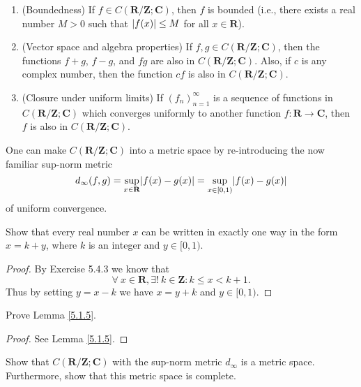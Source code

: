 \begin{lemma}\label{5.1.5}
    \quad
    \begin{enumerate}
        \item (Boundedness)
              If \(f \in C(\mathbf{R} / \mathbf{Z} ; \mathbf{C})\), then \(f\) is bounded
              (i.e., there
              exists a real number \(M > 0\) such that \(\abs*{f(x)} \leq M\) for all \(x \in \mathbf{R}\)).
        \item (Vector space and algebra properties)
              If \(f, g \in C(\mathbf{R} / \mathbf{Z} ; \mathbf{C})\), then the functions \(f + g\), \(f - g\), and \(f g\) are also in \(C(\mathbf{R} / \mathbf{Z} ; \mathbf{C})\).
              Also, if \(c\) is any complex number, then the function \(cf\) is also in \(C(\mathbf{R} / \mathbf{Z} ; \mathbf{C})\).
        \item (Closure under uniform limits)
              If \((f_n)_{n = 1}^\infty\) is a sequence of functions in \(C(\mathbf{R} / \mathbf{Z} ; \mathbf{C})\) which converges uniformly to another function \(f : \mathbf{R} \to \mathbf{C}\), then \(f\) is also in \(C(\mathbf{R} / \mathbf{Z} ; \mathbf{C})\).
    \end{enumerate}
\end{lemma}

\begin{note}
    One can make \(C(\mathbf{R} / \mathbf{Z} ; \mathbf{C})\) into a metric space by re-introducing the now familiar sup-norm metric
    \[
        d_\infty(f, g) = \sup_{x \in \mathbf{R}} \abs*{f(x) - g(x)} = \sup_{x \in [0, 1)} \abs*{f(x) - g(x)}
    \]
    of uniform convergence.
\end{note}

\exercisesection

\begin{exercise}\label{ex 5.1.1}
    Show that every real number \(x\) can be written in exactly one way in the form \(x = k + y\), where \(k\) is an integer and \(y \in [0, 1)\).
\end{exercise}

\begin{proof}
    By Exercise 5.4.3 we know that
    \[
        \forall\ x \in \mathbf{R}, \exists!\ k \in \mathbf{Z} : k \leq x < k + 1.
    \]
    Thus by setting \(y = x - k\) we have \(x = y + k\) and \(y \in [0, 1)\).
\end{proof}

\begin{exercise}\label{ex 5.1.2}
    Prove Lemma \ref{5.1.5}.
\end{exercise}

\begin{proof}
    See Lemma \ref{5.1.5}.
\end{proof}

\begin{exercise}\label{ex 5.1.3}
    Show that \(C(\mathbf{R} / \mathbf{Z} ; \mathbf{C})\) with the sup-norm metric \(d_\infty\) is a metric space.
    Furthermore, show that this metric space is complete.
\end{exercise}